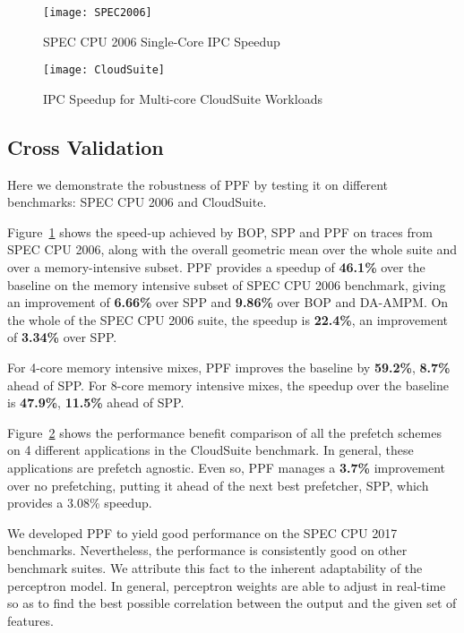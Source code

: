 \begin{figure}[ht]
\texttt{[image: SPEC2006]}
\caption{SPEC CPU 2006 Single-Core IPC Speedup}
\label{Fig:SPEC2006_1core}
\end{figure}

\begin{figure}[ht]
\texttt{[image: CloudSuite]}
\caption{IPC Speedup for Multi-core CloudSuite Workloads}
\label{Fig:CloudSuite}
\end{figure}

\subsection{Cross Validation}
\label{Results-CrossVal}


Here we demonstrate the robustness of PPF by testing it on different
benchmarks: SPEC CPU 2006 and CloudSuite.


Figure~\ref{Fig:SPEC2006_1core} shows the speed-up achieved by BOP, SPP and
PPF on traces from SPEC CPU 2006, along with the overall geometric mean over
the whole suite and over a memory-intensive subset.  PPF provides a speedup of
\textbf{46.1\%} over the baseline on the memory intensive subset of SPEC CPU
2006 benchmark, giving an improvement of \textbf{6.66\%} over SPP and
\textbf{9.86\%} over BOP and DA-AMPM.  On the whole of the SPEC CPU 2006
suite, the speedup is \textbf{22.4\%}, an improvement of \textbf{3.34\%} over
SPP.

For 4-core memory intensive mixes, PPF improves the baseline by
\textbf{59.2\%}, \textbf{8.7\%} ahead of SPP. For 8-core memory intensive
mixes, the speedup over the baseline is \textbf{47.9\%}, \textbf{11.5\%} ahead
of SPP.

Figure~\ref{Fig:CloudSuite} shows the performance benefit comparison of all
the prefetch schemes on 4 different applications in the CloudSuite benchmark.
In general, these applications are prefetch agnostic. Even so, PPF manages a
\textbf{3.7\%} improvement over no prefetching, putting it ahead of the next
best prefetcher, SPP, which provides a 3.08\% speedup.

We developed PPF to yield good performance on the SPEC CPU 2017 benchmarks.
Nevertheless, the performance is consistently good on other benchmark suites.
We attribute this fact to the inherent adaptability of the perceptron model.
In general, perceptron weights are able to adjust in real-time so as to find
the best possible correlation between the output and the given set of
features.
